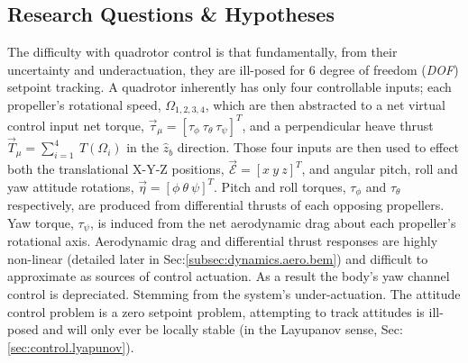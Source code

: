 \subsection{Research Questions \& Hypotheses}
\label{subsec:intro.foreword.hypotheses}
The difficulty with quadrotor control is that fundamentally, from their uncertainty and underactuation, they are ill-posed for 6 degree of freedom (\emph{DOF}) setpoint tracking. A quadrotor inherently has only four controllable inputs; each propeller's rotational speed, $\Omega_{1,2,3,4}$, which are then abstracted to a net virtual control input net torque, $\vec{\tau}_\mu=[\tau_{\phi}~\tau_{\theta}~\tau_{\psi}]^T$, and a perpendicular heave thrust $\vec{T}_\mu=\sum_{i=1}^{4}~T(\Omega_i)$ in the $\hat{z}_b$ direction. Those four inputs are then used to effect both the translational X-Y-Z positions, $\vec{\mathcal{E}}=[x~y~z]^T$, and angular pitch, roll and yaw attitude rotations, $\vec{\eta}=[\phi~\theta~\psi]^T$. Pitch and roll torques, $\tau_{\phi}$ and $\tau_{\theta}$ respectively, are produced from differential thrusts of each opposing propellers. Yaw torque, $\tau_{\psi}$, is induced from the net aerodynamic drag about each propeller's rotational axis. Aerodynamic drag and differential thrust responses are highly non-linear (detailed later in Sec:\ref{subsec:dynamics.aero.bem}) and difficult to approximate as sources of control actuation. As a result the body's yaw channel control is depreciated. Stemming from the system's under-actuation. The attitude control problem is a zero setpoint problem, attempting to track attitudes is ill-posed and will only ever be locally stable (in the Layupanov sense, Sec:\ref{sec:control.lyapunov}).
\par
